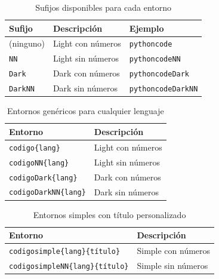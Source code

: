 \begin{table}[htbp]
\centering
\caption{Sufijos disponibles para cada entorno}
\label{tab:sufijos}
\EPScabeceraTabla
\begin{tabular}{lll}
\toprule
\textbf{Sufijo} & \textbf{Descripción} & \textbf{Ejemplo} \\
\midrule
(ninguno) & Light con números & \texttt{pythoncode} \\
\texttt{NN} & Light sin números & \texttt{pythoncodeNN} \\
\texttt{Dark} & Dark con números & \texttt{pythoncodeDark} \\
\texttt{DarkNN} & Dark sin números & \texttt{pythoncodeDarkNN} \\
\bottomrule
\end{tabular}
\end{table}

\begin{table}[htbp]
\centering
\caption{Entornos genéricos para cualquier lenguaje}
\label{tab:generico}
\EPScabeceraTabla
\begin{tabular}{ll}
\toprule
\textbf{Entorno} & \textbf{Descripción} \\
\midrule
\texttt{codigo\{lang\}} & Light con números \\
\texttt{codigoNN\{lang\}} & Light sin números \\
\texttt{codigoDark\{lang\}} & Dark con números \\
\texttt{codigoDarkNN\{lang\}} & Dark sin números \\
\bottomrule
\end{tabular}
\end{table}

\begin{table}[htbp]
\centering
\caption{Entornos simples con título personalizado}
\label{tab:codigosimple}
\EPScabeceraTabla
\begin{tabular}{ll}
\toprule
\textbf{Entorno} & \textbf{Descripción} \\
\midrule
\texttt{codigosimple\{lang\}\{título\}} & Simple con números \\
\texttt{codigosimpleNN\{lang\}\{título\}} & Simple sin números \\
\bottomrule
\end{tabular}
\end{table}
